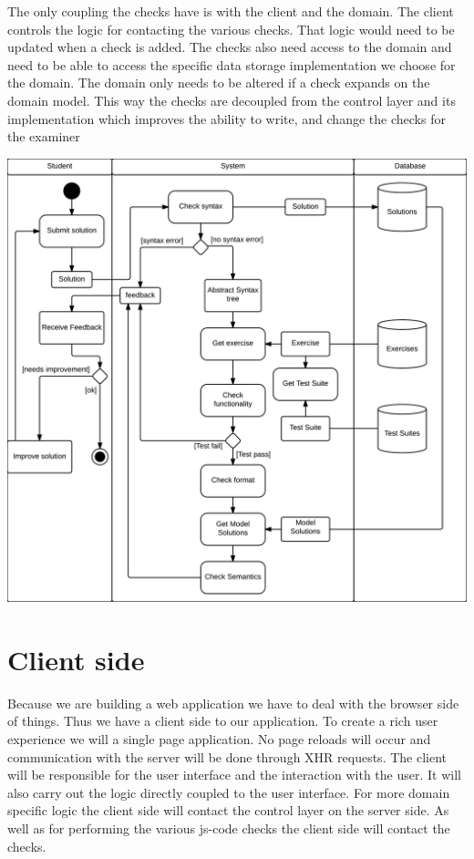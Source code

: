 The only coupling the checks have is with the client and the domain.
The client controls the logic for contacting the various checks.
That logic would need to be updated when a check is added.
The checks also need access to the domain
and need to be able to access
the specific data storage implementation we choose for the domain.
The domain only needs to be altered if a check expands on the domain model.
This way the checks are decoupled from the control layer
and its implementation
which improves the ability to write,
and change the checks for the \gls{examiner}

\includegraphics[scale=0.8]{diagrams-images/code-submission-activity-diagram}

\section{Client side}
Because we are building a web application
we have to deal with the browser side of things.
Thus we have a client side to our application.
To create a rich user experience we will a single page application.
No page reloads will occur
and communication with the server will be done through XHR requests.
The client will be responsible for the user interface
and the interaction with the user.
It will also carry out the logic directly coupled to the user interface.
For more domain specific logic
the client side will contact the control layer on the server side.
As well as for performing the various \gls{js-code} checks
the client side will contact the checks.

